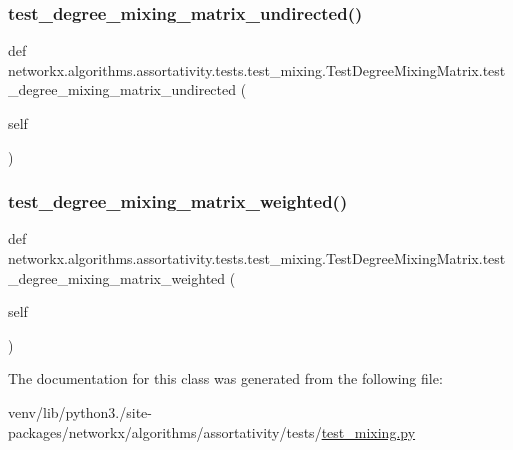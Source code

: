 \subsubsection{\texorpdfstring{test\+\_\+degree\+\_\+mixing\+\_\+matrix\+\_\+undirected()}{test\_degree\_mixing\_matrix\_undirected()}}
{\footnotesize\ttfamily def networkx.\+algorithms.\+assortativity.\+tests.\+test\+\_\+mixing.\+Test\+Degree\+Mixing\+Matrix.\+test\+\_\+degree\+\_\+mixing\+\_\+matrix\+\_\+undirected (\begin{DoxyParamCaption}\item[{}]{self }\end{DoxyParamCaption})}

\mbox{\label{classnetworkx_1_1algorithms_1_1assortativity_1_1tests_1_1test__mixing_1_1TestDegreeMixingMatrix_ab17a961a190a02dddc03161e2651cc41}} 
\subsubsection{\texorpdfstring{test\+\_\+degree\+\_\+mixing\+\_\+matrix\+\_\+weighted()}{test\_degree\_mixing\_matrix\_weighted()}}
{\footnotesize\ttfamily def networkx.\+algorithms.\+assortativity.\+tests.\+test\+\_\+mixing.\+Test\+Degree\+Mixing\+Matrix.\+test\+\_\+degree\+\_\+mixing\+\_\+matrix\+\_\+weighted (\begin{DoxyParamCaption}\item[{}]{self }\end{DoxyParamCaption})}



The documentation for this class was generated from the following file\+:\begin{DoxyCompactItemize}
\item 
venv/lib/python3./site-\/packages/networkx/algorithms/assortativity/tests/\hyperlink{test__mixing_8py}{test\+\_\+mixing.\+py}\end{DoxyCompactItemize}
